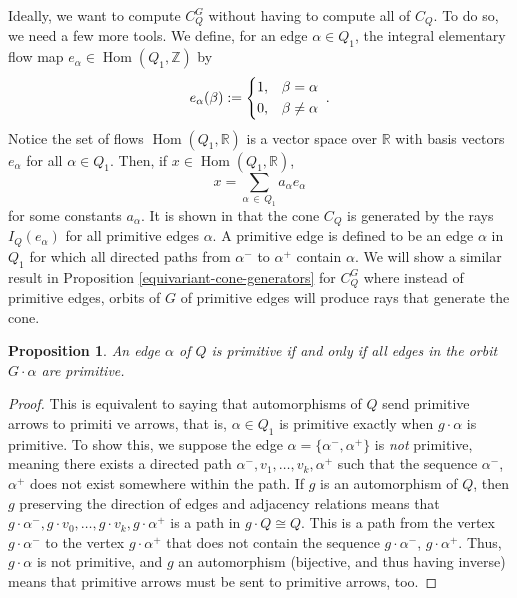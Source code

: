\documentclass[11pt]{amsart}
\theoremstyle{plain}
\newtheorem{proposition}[theorem]{Proposition}
\theoremstyle{definition}
\newcommand{\R}{\mathbb{R}}
\newcommand{\Z}{\mathbb{Z}}
\DeclareMathOperator{\Hom}{Hom}
\renewcommand{\hom}{\Hom}
\begin{document}
Ideally, we want to compute $C_Q^G$ without having to compute all of $C_Q$. To do so, we need a few more tools. We define, for an edge $\alpha \in Q_1$, the integral elementary flow map $e_\alpha \in \hom(Q_1, \Z)$ by
\[
e_\alpha(\beta) := \begin{dcases}
    1, &\beta = \alpha \\
    0, &\beta \neq \alpha
\end{dcases}\;.
\]
Notice the set of flows $\hom(Q_1, \R)$ is a vector space over $\R$ with basis vectors $e_\alpha$ for all $\alpha \in Q_1$. Then, if $x \in \hom(Q_1, \R)$, 
    \[
    x = \sum_{\alpha \,\in\, Q_1} a_\alpha e_\alpha
    \]
for some constants $a_\alpha$. It is shown in \cite{hille2003quivers} that the cone $C_Q$ is generated by the rays $I_Q(e_\alpha)$ for all primitive edges $\alpha$. A primitive edge is defined to be an edge $\alpha$ in $Q_1$ for which all directed paths from $\alpha^-$ to $\alpha^+$ contain $\alpha$. We will show a similar result in Proposition \ref{equivariant-cone-generators} for $C_Q^G$ where instead of primitive edges, orbits of $G$ of primitive edges will produce rays that generate the cone. 

\begin{proposition}
    An edge $\alpha$ of $Q$ is primitive if and only if all edges in the orbit $G \cdot \alpha$ are primitive.
\end{proposition}

\begin{proof}
    This is equivalent to saying that automorphisms of $Q$ send primitive arrows to primiti ve arrows, that is, $\alpha \in Q_1$ is primitive exactly when $g \cdot \alpha$ is primitive. To show this, we suppose the edge $\alpha = \{\alpha^-, \alpha^+\}$ is \textit{not} primitive, meaning there exists a directed path $\alpha^-, v_1, \ldots, v_k, \alpha^+$ such that the sequence $\alpha^-$, $\alpha^+$ does not exist somewhere within the path. If $g$ is an automorphism of $Q$, then $g$ preserving the direction of edges and adjacency relations means that $g \cdot \alpha^-, g \cdot v_0, \ldots, g \cdot v_k, g \cdot \alpha^+$ is a path in $g \cdot Q \cong Q$. This is a path from the vertex $g \cdot \alpha^-$ to the vertex $g \cdot \alpha^+$ that does not contain the sequence $g \cdot \alpha^-$, $g \cdot \alpha^+$. Thus, $g \cdot \alpha$ is not primitive, and $g$ an automorphism (bijective, and thus having inverse) means that primitive arrows must be sent to primitive arrows, too.
\end{proof}
\end{document}
